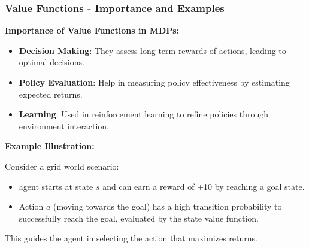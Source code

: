 \documentclass[aspectratio=169]{beamer}
\begin{document}
\begin{frame}[fragile]
    \frametitle{Value Functions - Importance and Examples}
    
    \textbf{Importance of Value Functions in MDPs:}
    
    \begin{itemize}
        \item \textbf{Decision Making}: They assess long-term rewards of actions, leading to optimal decisions.
        \item \textbf{Policy Evaluation}: Help in measuring policy effectiveness by estimating expected returns.
        \item \textbf{Learning}: Used in reinforcement learning to refine policies through environment interaction.
    \end{itemize}
    
    \textbf{Example Illustration:}
    
    Consider a grid world scenario:
    \begin{itemize}
        \item agent starts at state \(s\) and can earn a reward of +10 by reaching a goal state.
        \item Action \(a\) (moving towards the goal) has a high transition probability to successfully reach the goal, evaluated by the state value function.
    \end{itemize}
    
    This guides the agent in selecting the action that maximizes returns.
\end{frame}
\end{document}
